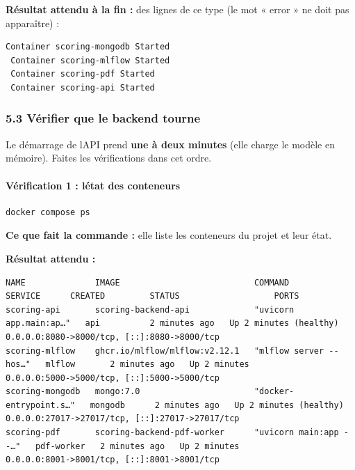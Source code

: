 \documentclass[
  french,
  11pt,
  a4paper,
]{article}
\begin{document}
\textbf{Résultat attendu à la fin :} des lignes de ce type (le mot «
error » ne doit pas apparaître) :

\begin{Verbatim}[breaklines=true,breakanywhere=true,fontsize=\small,frame=leftline,framerule=1.6pt,rulecolor=\color{credixblue},framesep=3mm,xleftmargin=2mm,xrightmargin=1mm]
 Container scoring-mongodb Started
 Container scoring-mlflow Started
 Container scoring-pdf Started
 Container scoring-api Started
\end{Verbatim}

\subsubsection{5.3 Vérifier que le backend
tourne}\label{53-vuxe9rifier-que-le-backend-tourne}

Le démarrage de l\textquotesingle API prend \textbf{une à deux minutes}
(elle charge le modèle en mémoire). Faites les vérifications dans cet
ordre.

\paragraph{Vérification 1 : l\textquotesingle état des
conteneurs}\label{vuxe9rification-1--luxe9tat-des-conteneurs}

\begin{Verbatim}[breaklines=true,breakanywhere=true,fontsize=\small,frame=leftline,framerule=1.6pt,rulecolor=\color{credixblue},framesep=3mm,xleftmargin=2mm,xrightmargin=1mm]
docker compose ps
\end{Verbatim}

\textbf{Ce que fait la commande :} elle liste les conteneurs du projet
et leur état.

\textbf{Résultat attendu :}

\begin{Verbatim}[breaklines=true,breakanywhere=true,fontsize=\small,frame=leftline,framerule=1.6pt,rulecolor=\color{credixblue},framesep=3mm,xleftmargin=2mm,xrightmargin=1mm]
NAME              IMAGE                           COMMAND                  SERVICE      CREATED         STATUS                   PORTS
scoring-api       scoring-backend-api             "uvicorn app.main:ap…"   api          2 minutes ago   Up 2 minutes (healthy)   0.0.0.0:8080->8000/tcp, [::]:8080->8000/tcp
scoring-mlflow    ghcr.io/mlflow/mlflow:v2.12.1   "mlflow server --hos…"   mlflow       2 minutes ago   Up 2 minutes             0.0.0.0:5000->5000/tcp, [::]:5000->5000/tcp
scoring-mongodb   mongo:7.0                       "docker-entrypoint.s…"   mongodb      2 minutes ago   Up 2 minutes (healthy)   0.0.0.0:27017->27017/tcp, [::]:27017->27017/tcp
scoring-pdf       scoring-backend-pdf-worker      "uvicorn main:app --…"   pdf-worker   2 minutes ago   Up 2 minutes             0.0.0.0:8001->8001/tcp, [::]:8001->8001/tcp
\end{Verbatim}
\end{document}
